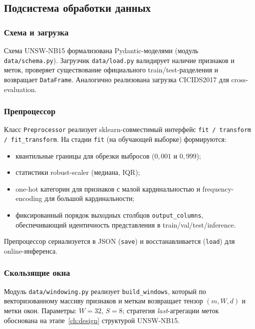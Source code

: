 \subsection{Подсистема обработки данных}

\subsubsection{Схема и загрузка}

Схема UNSW-NB15 формализована Pydantic-моделями (модуль
\texttt{data/schema.py}). Загрузчик \texttt{data/load.py} валидирует
наличие признаков и меток, проверяет существование официального
train/test-разделения и возвращает \texttt{DataFrame}. Аналогично
реализована загрузка CICIDS2017 для cross-evaluation.

\subsubsection{Препроцессор}

Класс \texttt{Preprocessor} реализует sklearn-совместимый интерфейс
\texttt{fit / transform / fit\_transform}. На стадии \texttt{fit}
(на обучающей выборке) формируются:

\begin{itemize}
    \item квантильные границы для обрезки выбросов
    (\(0{,}001\) и \(0{,}999\));
    \item статистики robust-scaler (медиана, IQR);
    \item one-hot категории для признаков с малой кардинальностью и
    frequency-encoding для большой кардинальности;
    \item фиксированный порядок выходных столбцов
    \texttt{output\_columns}, обеспечивающий идентичность
    представления в train/val/test/inference.
\end{itemize}

Препроцессор сериализуется в JSON (\texttt{save}) и восстанавливается
(\texttt{load}) для online-инференса.

\subsubsection{Скользящие окна}

Модуль \texttt{data/windowing.py} реализует \texttt{build\_windows},
который по векторизованному массиву признаков и меткам возвращает
тензор \((m, W, d)\) и метки окон. Параметры:
\(W = 32\), \(S = 8\); стратегия \emph{last}-агрегации меток
обоснована на этапе~\ref{ch:design} структурой UNSW-NB15.

